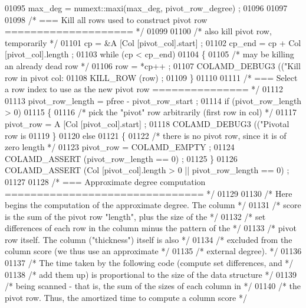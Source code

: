 \begin{DoxyCode}
{{{{{{{{{{{{{{{{{{{{01095     max\_deg = numext::maxi(max\_deg, pivot\_row\_degree) ;
01096 
01097 
01098     \textcolor{comment}{/* === Kill all rows used to construct pivot row ==================== */}
01099 
01100     \textcolor{comment}{/* also kill pivot row, temporarily */}
01101     cp = &A [Col [pivot\_col].start] ;
01102     cp\_end = cp + Col [pivot\_col].length ;
01103     \textcolor{keywordflow}{while} (cp < cp\_end)
01104     \{
01105       \textcolor{comment}{/* may be killing an already dead row */}
01106       row = *cp++ ;
01107       COLAMD\_DEBUG3 ((\textcolor{stringliteral}{"Kill row in pivot col: %
01108       KILL\_ROW (row) ;
01109     \}
01110 
01111     \textcolor{comment}{/* === Select a row index to use as the new pivot row =============== */}
01112 
01113     pivot\_row\_length = pfree - pivot\_row\_start ;
01114     \textcolor{keywordflow}{if} (pivot\_row\_length > 0)
01115     \{
01116       \textcolor{comment}{/* pick the "pivot" row arbitrarily (first row in col) */}
01117       pivot\_row = A [Col [pivot\_col].start] ;
01118       COLAMD\_DEBUG3 ((\textcolor{stringliteral}{"Pivotal row is %
01119     \}
01120     \textcolor{keywordflow}{else}
01121     \{
01122       \textcolor{comment}{/* there is no pivot row, since it is of zero length */}
01123       pivot\_row = COLAMD\_EMPTY ;
01124       COLAMD\_ASSERT (pivot\_row\_length == 0) ;
01125     \}
01126     COLAMD\_ASSERT (Col [pivot\_col].length > 0 || pivot\_row\_length == 0) ;
01127 
01128     \textcolor{comment}{/* === Approximate degree computation =============================== */}
01129 
01130     \textcolor{comment}{/* Here begins the computation of the approximate degree.  The column */}
01131     \textcolor{comment}{/* score is the sum of the pivot row "length", plus the size of the */}
01132     \textcolor{comment}{/* set differences of each row in the column minus the pattern of the */}
01133     \textcolor{comment}{/* pivot row itself.  The column ("thickness") itself is also */}
01134     \textcolor{comment}{/* excluded from the column score (we thus use an approximate */}
01135     \textcolor{comment}{/* external degree). */}
01136 
01137     \textcolor{comment}{/* The time taken by the following code (compute set differences, and */}
01138     \textcolor{comment}{/* add them up) is proportional to the size of the data structure */}
01139     \textcolor{comment}{/* being scanned - that is, the sum of the sizes of each column in */}
01140     \textcolor{comment}{/* the pivot row.  Thus, the amortized time to compute a column score */}
}}}}}}}}}}}}}}}}}}}}}}
\end{DoxyCode}
